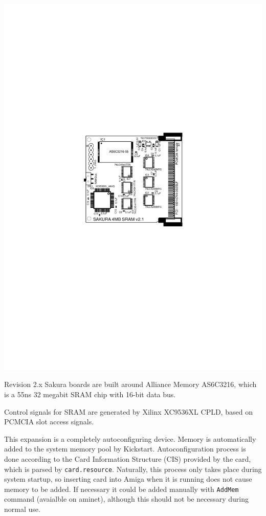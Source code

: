 \documentclass[10pt,a5paper]{article}
\begin{document}
\begin{center}
\includegraphics{board21layout.pdf}
\end{center}

Revision 2.x Sakura boards are built around Alliance Memory AS6C3216, which is a 55ns 32 megabit SRAM chip with 16-bit data bus.

Control signals for SRAM are generated by Xilinx XC9536XL CPLD, based on PCMCIA slot access signals.

This expansion is a completely autoconfiguring device. Memory is automatically added to the system memory pool by Kickstart. Autoconfiguration process is done according to the Card Information Structure (CIS) provided by the card, which is parsed by {\tt card.resource}. Naturally, this process only takes place during system startup, so inserting card into Amiga when it is running does not cause memory to be added. If necessary it could be added manually with {\tt AddMem} command (avaialble on aminet), although this should not be necessary during normal use.
\end{document}
